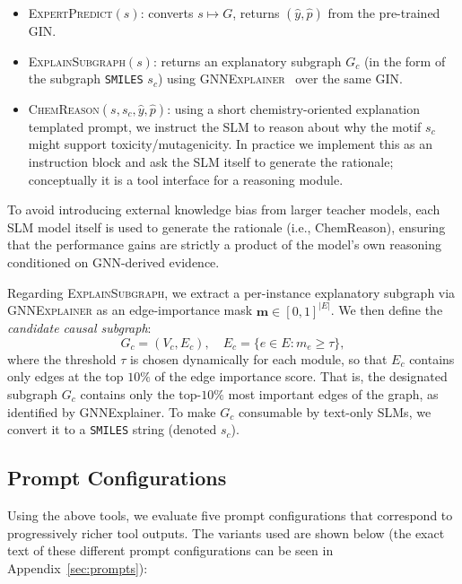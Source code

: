 \documentclass[
]{ceurart}
\newcommand{\tool}[1]{\textsc{#1}}
\newcommand{\smiles}{\texttt{SMILES}}
\newcommand{\gin}{\textsc{GIN}}
\newcommand{\gnne}{\textsc{GNNExplainer}}
\begin{document}




\begin{itemize}[leftmargin=1.2em]
  \item \tool{ExpertPredict}$(s)$: converts $s \mapsto G$, returns $(\hat{y},\hat{p})$ from the pre-trained \gin{}.
  \item \tool{ExplainSubgraph}$(s)$: returns an explanatory subgraph $G_c$ (in the form of the subgraph \smiles{} $s_c$) using \gnne{}~\cite{Ying2019} over the same \gin{}.
  \item \tool{ChemReason}$(s, s_c, \hat{y}, \hat{p})$: using a short chemistry-oriented explanation templated prompt, we instruct the SLM to reason about why the motif $s_c$ might support toxicity/mutagenicity. In practice we implement this as an instruction block and ask the SLM itself to generate the rationale; conceptually it is a tool interface for a reasoning module.
\end{itemize}

\noindent To avoid introducing external knowledge bias from larger teacher models, each SLM model itself is used to generate the rationale (i.e., ChemReason), ensuring that the performance gains are strictly a product of the model's own reasoning conditioned on GNN-derived evidence.

\noindent  Regarding \tool{ExplainSubgraph}, we extract a per-instance explanatory subgraph via
\gnne{} as an edge-importance mask $\mathbf{m}\in[0,1]^{|E|}$. We then define the \emph{candidate causal subgraph}:
\begin{equation*}
G_{c} = (V_c, E_c), \quad E_c = \{ e \in E : m_e \ge \tau \},
\end{equation*}
where the threshold $\tau$ is chosen dynamically for each module, so that $E_c$ contains only edges at the top $10\%$ of the edge importance score. That is, the designated subgraph $G_c$ contains only the top-$10\%$ most important edges of the graph, as identified by GNNExplainer. To make $G_c$ consumable by text-only SLMs, we convert it to a \smiles{}
string (denoted $s_c$).



\subsection{Prompt Configurations}
Using the above tools, we evaluate five prompt configurations that correspond to progressively richer tool outputs. The variants used are shown below (the exact text of these different prompt configurations can be seen in Appendix~\ref{sec:prompts}):
\end{document}
